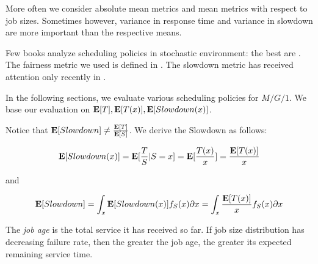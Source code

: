 More often we consider absolute mean metrics and mean metrics with respect to job sizes.
Sometimes however, variance in response time and variance in slowdown are more important than the respective means.

Few books analyze scheduling policies in stochastic environment: the best are \cite{conway2012theory,kleinrock1976queueing}.
The fairness metric we used is defined in \cite{bansal2001analysis}. The slowdown metric has received attention only recently in \cite{hyytia2012minimizing}.

In the following sections, we evaluate various scheduling policies for $M/G/1$. We base our evaluation on $\mathbf{E}[T],\mathbf{E}[T(x)],\mathbf{E}[Slowdown(x)]$.

Notice that $\mathbf{E}[Slowdown]\neq\frac{\mathbf{E}[T]}{\mathbf{E}[S]}$. We derive the Slowdown as follows:

\begin{equation*}
\mathbf{E}[Slowdown(x)]=\mathbf{E}[\frac{T}{S}|S=x]=\mathbf{E}[\frac{T(x)}{x}]=\frac{\mathbf{E}[T(x)]}{x}
\end{equation*}

and

\begin{equation*}
\mathbf{E}[Slowdown]=\int_{x}\mathbf{E}[Slowdown(x)]f_{S}(x)\partial x=\int_{x}\frac{\mathbf{E}[T(x)]}{x}f_{S}(x)\partial x
\end{equation*}

The \textit{job age} is the total service it has received so far. If job size distribution has decreasing failure rate, then the greater the job age, the greater its expected remaining service time.